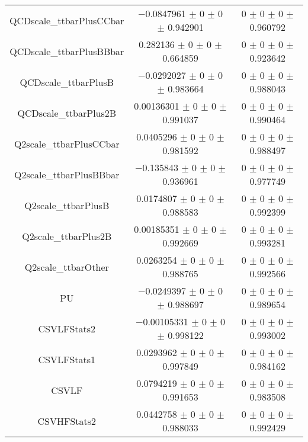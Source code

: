 \begin{table}
\begin{tabular}{ccc}
QCDscale\_ttbarPlusCCbar 	& \num{-0.0847961} $\pm$ \num{0} $\pm$ \num{0} $\pm$ \num{0.942901} 	& \num{0} $\pm$ \num{0} $\pm$ \num{0} $\pm$ \num{0.960792}\\
QCDscale\_ttbarPlusBBbar 	& \num{0.282136} $\pm$ \num{0} $\pm$ \num{0} $\pm$ \num{0.664859} 	& \num{0} $\pm$ \num{0} $\pm$ \num{0} $\pm$ \num{0.923642}\\
QCDscale\_ttbarPlusB 	& \num{-0.0292027} $\pm$ \num{0} $\pm$ \num{0} $\pm$ \num{0.983664} 	& \num{0} $\pm$ \num{0} $\pm$ \num{0} $\pm$ \num{0.988043}\\
QCDscale\_ttbarPlus2B 	& \num{0.00136301} $\pm$ \num{0} $\pm$ \num{0} $\pm$ \num{0.991037} 	& \num{0} $\pm$ \num{0} $\pm$ \num{0} $\pm$ \num{0.990464}\\
Q2scale\_ttbarPlusCCbar 	& \num{0.0405296} $\pm$ \num{0} $\pm$ \num{0} $\pm$ \num{0.981592} 	& \num{0} $\pm$ \num{0} $\pm$ \num{0} $\pm$ \num{0.988497}\\
Q2scale\_ttbarPlusBBbar 	& \num{-0.135843} $\pm$ \num{0} $\pm$ \num{0} $\pm$ \num{0.936961} 	& \num{0} $\pm$ \num{0} $\pm$ \num{0} $\pm$ \num{0.977749}\\
Q2scale\_ttbarPlusB 	& \num{0.0174807} $\pm$ \num{0} $\pm$ \num{0} $\pm$ \num{0.988583} 	& \num{0} $\pm$ \num{0} $\pm$ \num{0} $\pm$ \num{0.992399}\\
Q2scale\_ttbarPlus2B 	& \num{0.00185351} $\pm$ \num{0} $\pm$ \num{0} $\pm$ \num{0.992669} 	& \num{0} $\pm$ \num{0} $\pm$ \num{0} $\pm$ \num{0.993281}\\
Q2scale\_ttbarOther 	& \num{0.0263254} $\pm$ \num{0} $\pm$ \num{0} $\pm$ \num{0.988765} 	& \num{0} $\pm$ \num{0} $\pm$ \num{0} $\pm$ \num{0.992566}\\
PU 	& \num{-0.0249397} $\pm$ \num{0} $\pm$ \num{0} $\pm$ \num{0.988697} 	& \num{0} $\pm$ \num{0} $\pm$ \num{0} $\pm$ \num{0.989654}\\
CSVLFStats2 	& \num{-0.00105331} $\pm$ \num{0} $\pm$ \num{0} $\pm$ \num{0.998122} 	& \num{0} $\pm$ \num{0} $\pm$ \num{0} $\pm$ \num{0.993002}\\
CSVLFStats1 	& \num{0.0293962} $\pm$ \num{0} $\pm$ \num{0} $\pm$ \num{0.997849} 	& \num{0} $\pm$ \num{0} $\pm$ \num{0} $\pm$ \num{0.984162}\\
CSVLF 	& \num{0.0794219} $\pm$ \num{0} $\pm$ \num{0} $\pm$ \num{0.991653} 	& \num{0} $\pm$ \num{0} $\pm$ \num{0} $\pm$ \num{0.983508}\\
CSVHFStats2 	& \num{0.0442758} $\pm$ \num{0} $\pm$ \num{0} $\pm$ \num{0.988033} 	& \num{0} $\pm$ \num{0} $\pm$ \num{0} $\pm$ \num{0.992429}\\

\end{tabular}
\end{table}
